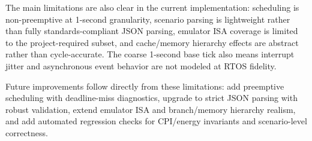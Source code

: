 \documentclass[11pt,a4paper]{article}
\begin{document}
The main limitations are also clear in the current implementation: scheduling is non-preemptive at 1-second granularity, scenario parsing is lightweight rather than fully standards-compliant JSON parsing, emulator ISA coverage is limited to the project-required subset, and cache/memory hierarchy effects are abstract rather than cycle-accurate. The coarse 1-second base tick also means interrupt jitter and asynchronous event behavior are not modeled at RTOS fidelity.

Future improvements follow directly from these limitations: add preemptive scheduling with deadline-miss diagnostics, upgrade to strict JSON parsing with robust validation, extend emulator ISA and branch/memory hierarchy realism, and add automated regression checks for CPI/energy invariants and scenario-level correctness.
\end{document}

